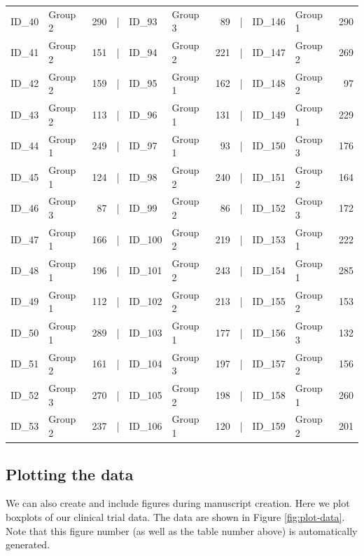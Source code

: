 \documentclass[smallextended]{svjour3}       %
\begin{document}
\begin{table}
\begin{tabular}[t]{llrlllrlllr}
ID\_40 & Group 2 & 290 & | & ID\_93 & Group 3 & 89 & | & ID\_146 & Group 1 & 290\\
\addlinespace
ID\_41 & Group 2 & 151 & | & ID\_94 & Group 2 & 221 & | & ID\_147 & Group 2 & 269\\
ID\_42 & Group 2 & 159 & | & ID\_95 & Group 1 & 162 & | & ID\_148 & Group 2 & 97\\
ID\_43 & Group 2 & 113 & | & ID\_96 & Group 1 & 131 & | & ID\_149 & Group 1 & 229\\
ID\_44 & Group 1 & 249 & | & ID\_97 & Group 1 & 93 & | & ID\_150 & Group 3 & 176\\
ID\_45 & Group 1 & 124 & | & ID\_98 & Group 2 & 240 & | & ID\_151 & Group 2 & 164\\
\addlinespace
ID\_46 & Group 3 & 87 & | & ID\_99 & Group 2 & 86 & | & ID\_152 & Group 3 & 172\\
ID\_47 & Group 1 & 166 & | & ID\_100 & Group 2 & 219 & | & ID\_153 & Group 1 & 222\\
ID\_48 & Group 1 & 196 & | & ID\_101 & Group 2 & 243 & | & ID\_154 & Group 1 & 285\\
ID\_49 & Group 1 & 112 & | & ID\_102 & Group 2 & 213 & | & ID\_155 & Group 2 & 153\\
ID\_50 & Group 1 & 289 & | & ID\_103 & Group 1 & 177 & | & ID\_156 & Group 3 & 132\\
\addlinespace
ID\_51 & Group 2 & 161 & | & ID\_104 & Group 3 & 197 & | & ID\_157 & Group 2 & 156\\
ID\_52 & Group 3 & 270 & | & ID\_105 & Group 2 & 198 & | & ID\_158 & Group 1 & 260\\
ID\_53 & Group 2 & 237 & | & ID\_106 & Group 1 & 120 & | & ID\_159 & Group 2 & 201\\
\bottomrule
\end{tabular}
\end{table}

\hypertarget{sec:3}{%
\subsection{Plotting the data}\label{sec:3}}

We can also create and include figures during manuscript creation. Here we plot boxplots of our clinical trial data. The data are shown in Figure \ref{fig:plot-data}. Note that this figure number (as well as the table number above) is automatically generated.
\end{document}
